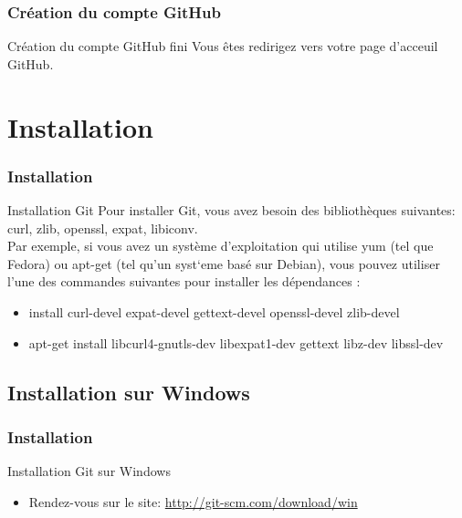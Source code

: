 \documentclass{beamer}
\begin{document}

\begin{frame}
\frametitle{Cr\'eation du compte GitHub}
\begin{block}{Cr\'eation du compte GitHub fini}
Vous \^{e}tes redirigez vers votre page d'acceuil GitHub.
\end{block}
\end{frame}







\section{Installation}
\begin{frame}
\frametitle{Installation}
\begin{block}{Installation Git}
Pour installer Git, vous avez besoin des biblioth\`{e}ques suivantes: curl, zlib, openssl, expat, libiconv.\\ Par exemple, si vous avez un syst\`{e}me d'exploitation qui utilise yum (tel que Fedora) ou apt-get (tel qu'un syst`{e}me bas\'{e} sur Debian), vous pouvez utiliser l'une des commandes suivantes pour installer les d\'{e}pendances :
\begin{itemize}
\item install curl-devel expat-devel gettext-devel 
  openssl-devel zlib-devel

\item apt-get install libcurl4-gnutls-dev libexpat1-dev gettext 
  libz-dev libssl-dev
\end{itemize}
\end{block}
\end{frame}


\subsection{Installation sur Windows}\label{Installation sur Windows}
\begin{frame}
\frametitle{Installation}
\begin{block}{Installation Git sur Windows}
\begin{itemize}
\item Rendez-vous sur le site: \href{http://git-scm.com/download/win}{http://git-scm.com/download/win}
\end{itemize}
\end{block}
\end{frame}
\end{document}
